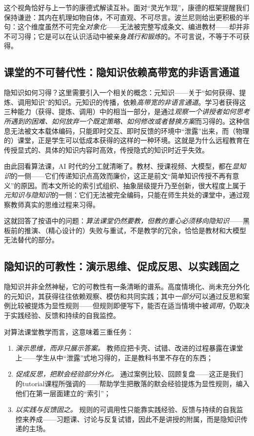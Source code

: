 这个视角恰好与上一节的康德式解读互补。面对“灵光乍现”，康德的框架提醒我们保持谦逊：其内在机理如物自体，不可直观、不可尽言。波兰尼则给出更积极的半句：这个维度虽然不可完全\textit{对象化}——无法被完整写成条文、编进教材——却并非不可习得；它是可以在认识活动中被亲身\textit{践行和锻炼}的。不可言说，不等于不可获得。

\subsection{课堂的不可替代性：隐知识依赖高带宽的非语言通道}

隐知识如何习得？这里需要引入一个相关的概念：元知识——关于“如何获得、提炼、调用知识”的知识。元知识的传播，依赖\textit{高带宽的非语言通道}。学习者获得这三种能力（获得、提炼、调用）中的相当一部分，是通过\textit{观察一个讲授者如何思考所遇到的困难、如何放弃一个既定策略、如何修改或者替换方案}而习得的。这种信息无法被文本载体编码，只能即时交互、即时反馈的环境中“泄露”出来，而（物理的）课堂，正是学生可以低成本获得的这样的一种环境。这就是为什么远程教育在传授显式的、具体的知识内容时高效，传授隐式的知识时近乎失效。

由此回看算法课，AI 时代的分工就清晰了。教材、授课视频、大模型，都在\textit{显知识}的一侧——它们传递知识点高效而廉价，这正是前文“简单知识传授不再有意义”的原因。而本文所论的索引式组织、抽象层级提升乃至创新，很大程度上属于\textit{元知识与隐知识}的一侧：它们无法被完全编码，只能在师生共处的课堂中，通过观察教师真实的思维过程来习得。

这就回答了按语中的问题：\textit{算法课堂仍然要教，但教的重心必须移向隐知识}——黑板前的推演、（精心设计的）失败与重试，不是教学的冗余，恰恰是教材和大模型无法替代的部分。

\subsection{隐知识的可教性：演示思维、促成反思、以实践固之}

隐知识并非全然神秘，它的可教性有一条清晰的谱系。高度情境化、尚未充分外化的元知识，其获得往往依赖观察、模仿和共同实践；其中\textit{一部分}可以通过反思和案例比较被提炼为显性规则——但规则即便写下，能否在适当情境中被\textit{调用}，仍取决于实践经验、反馈和持续的自我监控。

对算法课堂教学而言，这意味着三重任务：
\begin{enumerate}[label=\arabic*.]
    \item \textit{演示思维，而非只展示答案。} 教师应把卡壳、试错、改进的过程暴露在课堂上——学生从中“泄露”式地习得的，正是教科书里不存在的东西；
    \item \textit{促成反思，把默会经验部分外化。} 通过案例比较、回顾复盘——这正是我们的tutorial课程所强调的——帮助学生把散落的默会经验提炼为显性规则，编入他们在第一层面建立的“索引”；
    \item \textit{以实践与反馈固之。} 规则的可调用性只能靠实践经验、反馈与持续的自我监控来养成——习题课、讨论与反复试错，因此不是讲授的附属，而是隐知识传递的主场。
\end{enumerate}

